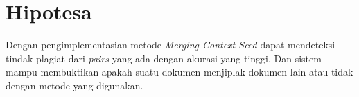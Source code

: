 \documentclass[../Proposal.tex]{subfiles}
\begin{document}
	\section{Hipotesa}
	\noindent Dengan pengimplementasian metode \textit{Merging Context Seed} dapat mendeteksi tindak plagiat dari \textit{pairs} yang ada dengan akurasi yang tinggi. Dan sistem mampu membuktikan apakah suatu dokumen menjiplak dokumen lain atau tidak dengan metode yang digunakan.
\end{document}
